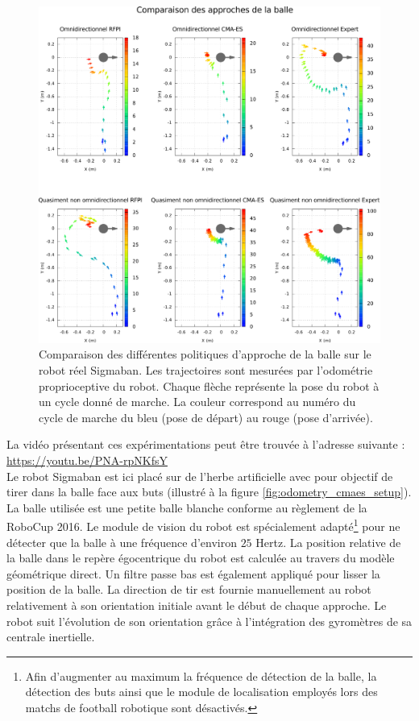 \begin{figure}[htb]
    \centerfloat
    \includegraphics[type=pdf,ext=.pdf,read=.pdf,width=1.3\linewidth]{../plot/OdometryCMAES/robotTrajs}
    \caption{\label{fig:odometry_cmaes_robottrajs} 
        Comparaison des différentes politiques d'approche de la balle
        sur le robot réel Sigmaban.
        Les trajectoires sont mesurées par l'odométrie proprioceptive du robot.
        Chaque flèche représente la pose du robot à un cycle donné de marche.
        La couleur correspond au numéro du cycle de marche du bleu (pose de départ)
        au rouge (pose d'arrivée).
    }
\end{figure}

La vidéo présentant ces expérimentations peut être trouvée 
à l'adresse suivante :
\url{https://youtu.be/PNA-rpNKfsY}\\

Le robot Sigmaban est ici placé sur de l'herbe artificielle avec pour 
objectif de tirer dans la balle face aux buts 
(illustré à la figure \ref{fig:odometry_cmaes_setup}).
La balle utilisée est une petite balle blanche conforme au règlement de la RoboCup 2016.
Le module de vision du robot est spécialement adapté\footnote{Afin d'augmenter 
au maximum la fréquence de détection de la balle, la détection des buts ainsi 
que le module de localisation employés lors des matchs de football robotique sont désactivés.}
pour ne détecter que la balle à une fréquence d'environ $25$ Hertz.
La position relative de la balle dans le repère égocentrique du
robot est calculée au travers du modèle géométrique direct. 
Un filtre passe bas est également appliqué pour lisser la position de la balle.
La direction de tir est fournie manuellement au robot relativement à
son orientation initiale avant le début de chaque approche.
Le robot suit l'évolution de son orientation grâce à l'intégration
des gyromètres de sa centrale inertielle.\\

